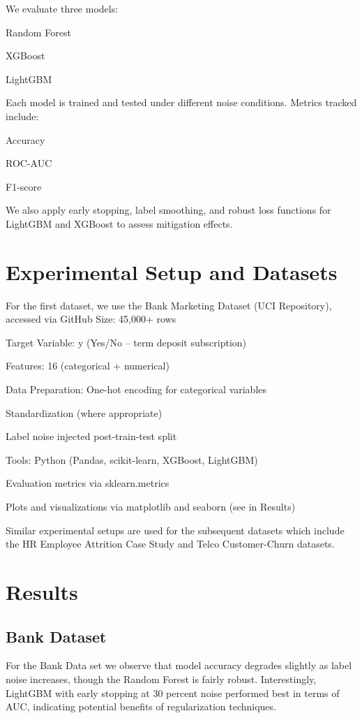 \documentclass[conference]{IEEEtran}
\begin{document}
We evaluate three models:

Random Forest

XGBoost

LightGBM

Each model is trained and tested under different noise conditions. Metrics tracked include:

Accuracy

ROC-AUC

F1-score

We also apply early stopping, label smoothing, and robust loss functions for LightGBM and XGBoost to assess mitigation effects.



\section{Experimental Setup and Datasets}

For the first dataset, we use the Bank Marketing Dataset (UCI Repository), accessed via GitHub
Size: 45,000+ rows

Target Variable: y (Yes/No – term deposit subscription)

Features: 16 (categorical + numerical)

Data Preparation:
One-hot encoding for categorical variables

Standardization (where appropriate)

Label noise injected post-train-test split

Tools:
Python (Pandas, scikit-learn, XGBoost, LightGBM)

Evaluation metrics via sklearn.metrics

Plots and visualizations via matplotlib and seaborn (see in Results)

Similar experimental setups are used for the subsequent datasets which include the HR Employee Attrition Case Study and Telco Customer-Churn datasets.



\section{Results}
\subsection{Bank Dataset}
For the Bank Data set we observe that model accuracy degrades slightly as label noise increases, though the Random Forest is fairly robust. Interestingly, LightGBM with early stopping at 30 percent noise performed best in terms of AUC, indicating potential benefits of regularization techniques.
\end{document}
